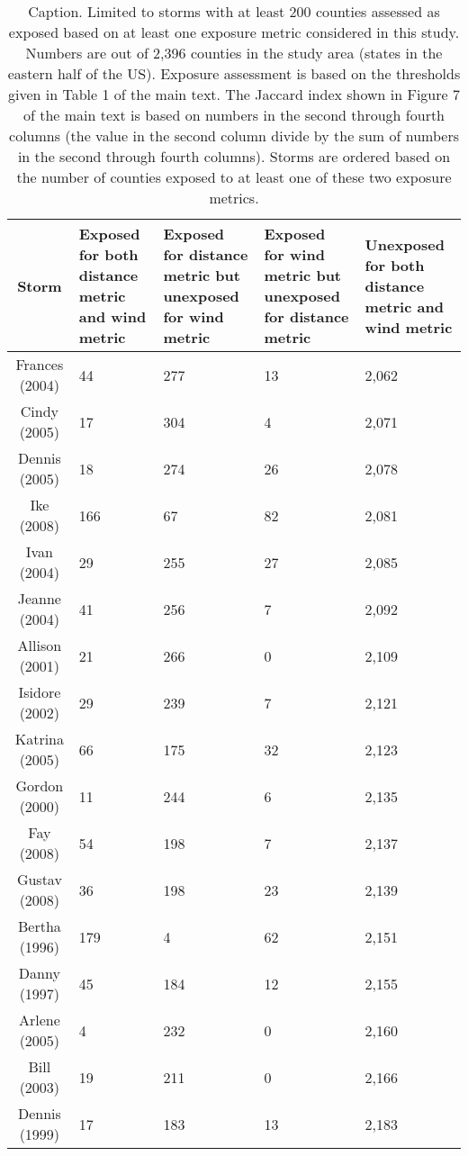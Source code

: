 \begin{table}[ht]
\centering
\caption{Caption. Limited to storms with at least 200 counties assessed as exposed based on at least one exposure metric considered in this study. Numbers are out of 2,396 counties in the study area (states in the eastern half of the US). Exposure assessment is based on the thresholds given in Table 1 of the main text. The Jaccard index shown in Figure 7 of the main text is based on numbers in the second through fourth columns (the value in the second column divide by the sum of numbers in the second through fourth columns). Storms are ordered based on the number of counties exposed to at least one of these two exposure metrics.} 
\label{tab:misclasswind}
\begin{tabular}{cP{3cm}P{3cm}P{3cm}P{3cm}}
  \toprule
Storm & Exposed for both distance metric and wind metric & Exposed for distance metric but unexposed for wind metric & Exposed for wind metric but unexposed for distance metric & Unexposed for both distance metric and wind metric \\ 
  \midrule
Frances (2004) & 44 & 277 & 13 & 2,062 \\ 
  Cindy (2005) & 17 & 304 & 4 & 2,071 \\ 
  Dennis (2005) & 18 & 274 & 26 & 2,078 \\ 
  Ike (2008) & 166 & 67 & 82 & 2,081 \\ 
  Ivan (2004) & 29 & 255 & 27 & 2,085 \\ 
  Jeanne (2004) & 41 & 256 & 7 & 2,092 \\ 
  Allison (2001) & 21 & 266 & 0 & 2,109 \\ 
  Isidore (2002) & 29 & 239 & 7 & 2,121 \\ 
  Katrina (2005) & 66 & 175 & 32 & 2,123 \\ 
  Gordon (2000) & 11 & 244 & 6 & 2,135 \\ 
  Fay (2008) & 54 & 198 & 7 & 2,137 \\ 
  Gustav (2008) & 36 & 198 & 23 & 2,139 \\ 
  Bertha (1996) & 179 & 4 & 62 & 2,151 \\ 
  Danny (1997) & 45 & 184 & 12 & 2,155 \\ 
  Arlene (2005) & 4 & 232 & 0 & 2,160 \\ 
  Bill (2003) & 19 & 211 & 0 & 2,166 \\ 
  Dennis (1999) & 17 & 183 & 13 & 2,183 \\ 

\end{tabular}
\end{table}
